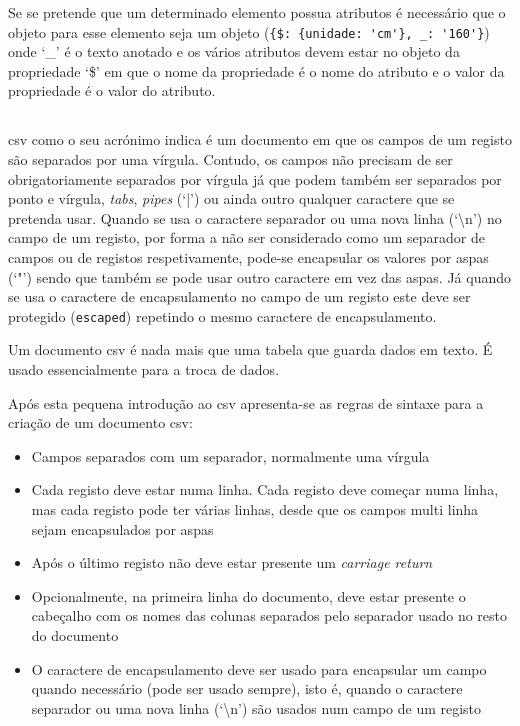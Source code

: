 Se se pretende que um determinado elemento possua atributos é necessário que o objeto para esse elemento seja um objeto (\verb|{$: {unidade: 'cm'}, _: '160'}|) onde `\_' é o texto anotado e os vários atributos devem estar no objeto da propriedade `\$' em que o nome da propriedade é o nome do atributo e o valor da propriedade é o valor do atributo.

\subsection{}

\acrfull{csv} como o seu acrónimo indica é um documento em que os campos de um registo são separados por uma vírgula. Contudo, os campos não precisam de ser obrigatoriamente separados por vírgula já que podem também ser separados por ponto e vírgula, \textit{tabs}, \textit{pipes} (`|') ou ainda outro qualquer caractere que se pretenda usar. Quando se usa o caractere separador ou uma nova linha (`\backslash{}n') no campo de um registo, por forma a não ser considerado como um separador de campos ou de registos respetivamente, pode-se encapsular os valores por aspas (`"') sendo que também se pode usar outro caractere em vez das aspas. Já quando se usa o caractere de encapsulamento no campo de um registo este deve ser protegido (\texttt{escaped}) repetindo o mesmo caractere de encapsulamento.

Um documento \acrshort{csv} é nada mais que uma tabela que guarda dados em texto. É usado essencialmente para a troca de dados.

Após esta pequena introdução ao \acrshort{csv} apresenta-se as regras de sintaxe para a criação de um documento \acrshort{csv}:
\begin{itemize}
    \item Campos separados com um separador, normalmente uma vírgula
    \item Cada registo deve estar numa linha. Cada registo deve começar numa linha, mas cada registo pode ter várias linhas, desde que os campos multi linha sejam encapsulados por aspas
    \item Após o último registo não deve estar presente um \textit{carriage return}
    \item Opcionalmente, na primeira linha do documento, deve estar presente o cabeçalho com os nomes das colunas separados pelo separador usado no resto do documento
    \item O caractere de encapsulamento deve ser usado para encapsular um campo quando necessário (pode ser usado sempre), isto é, quando o caractere separador ou uma nova linha (`\backslash{}n') são usados num campo de um registo
\end{itemize}

